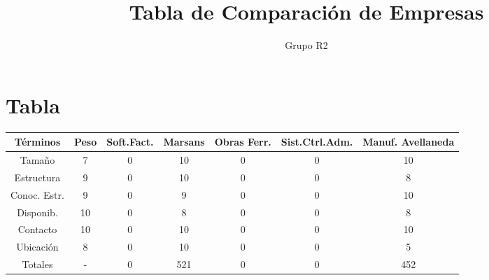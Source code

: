 \documentclass[12pt,a4paper,spanish]{article}
\begin{document}
 

\pagestyle{plain}
\title{Tabla de Comparaci\'{o}n de Empresas} 
\author{Grupo R2} 
\maketitle 
\newpage
\tableofcontents
\newpage
\section{Tabla}
\small
\begin{center}
\begin{tabular}{|| c | c | c | c | c | c | c ||}
\hline
\hline
T\'{e}rminos & Peso & Soft.Fact. & Marsans & Obras Ferr. & Sist.Ctrl.Adm. & Manuf. Avellaneda\\
\hline
Tama\~{n}o   & 7 & 0 & 10 & 0 & 0 & 10 \\
\hline
Estructura & 9 & 0 & 10 & 0 & 0 & 8 \\
\hline
Conoc. Estr. & 9 & 0 & 9 & 0 & 0 & 10 \\
\hline
Disponib.  & 10 & 0 & 8 & 0 & 0 & 8 \\
\hline
Contacto   & 10 & 0 & 10 & 0 & 0 & 10 \\
\hline
Ubicaci\'{o}n & 8  & 0 & 10 & 0 & 0 & 5 \\
\hline
\hline
Totales & - & 0 & 521 & 0 & 0 & 452 \\
\hline

\end{tabular}
\end{center}
\normalsize
\end{document}
